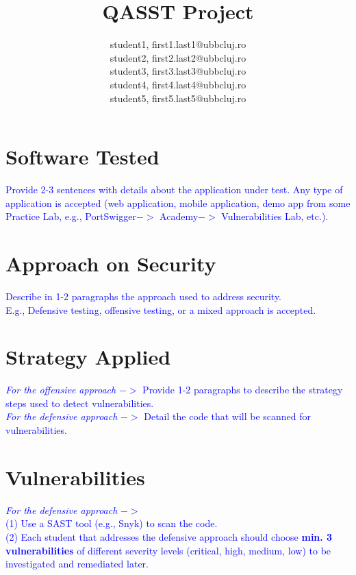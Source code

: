 \documentclass{article}
\title{\textbf{QASST Project}}
\author{student1, first1.last1@ubbcluj.ro\\
student2, first2.last2@ubbcluj.ro\\
student3, first3.last3@ubbcluj.ro\\
student4, first4.last4@ubbcluj.ro\\
student5, first5.last5@ubbcluj.ro}
\begin{document}
\maketitle


\tableofcontents

\newpage

\section{Software Tested}
\label{label:Software_tested}

\textcolor{blue}{Provide 2-3 sentences with details about the application under test. Any type of application is accepted (web application, mobile application, demo app from some Practice Lab, e.g., PortSwigger$->$ Academy$->$ Vulnerabilities Lab, etc.).}



\section{Approach on Security}
\label{}

\textcolor{blue}{Describe in 1-2 paragraphs the approach used to address security. \\
E.g., Defensive testing, offensive testing, or a mixed approach is accepted.
}

\section{Strategy Applied}
\label{}

\textcolor{blue}{\textit{For the offensive approach} $->$ Provide 1-2 paragraphs to describe the strategy steps used to detect vulnerabilities.\\
\textit{For the defensive approach} $->$ Detail the code that will be scanned for vulnerabilities.
}


\section{Vulnerabilities}
\label{}

\textcolor{blue}{\textit{For the defensive approach} $->$ \\(1) Use a SAST tool (e.g., Snyk) to scan the code.\\
(2) Each student that addresses the defensive approach should choose \textbf{min. 3 vulnerabilities} of different severity levels (critical, high, medium, low) to be investigated and remediated later.}
\end{document}
